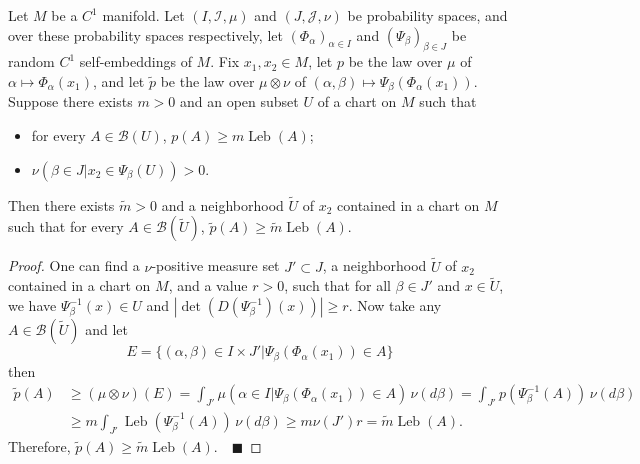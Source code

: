 \documentclass[tablecaption=bottom,wcp]{jmlr} %
\begin{document}
\begin{lemma} \label{Newman lemma}
    Let $M$ be a $C^1$ manifold. Let $(I, \mathcal{I}, \mu)$ and $(J, \mathcal{J}, \nu)$ be probability spaces, and over these probability spaces respectively, let $(\Phi_\alpha)_{\alpha\in I}$ and $(\Psi_\beta)_{\beta\in J}$ be random $C^1$ self-embeddings of $M$. Fix $x_1, x_2 \in M$, let $p$ be the law over $\mu$ of $\alpha \mapsto \Phi_\alpha(x_1)$, and let $\tilde{p}$ be the law over $\mu \otimes \nu$ of $(\alpha, \beta) \mapsto \Psi_\beta(\Phi_\alpha(x_1))$. Suppose there exists $m > 0$ and an open subset $U$ of a chart on $M$ such that
\begin{itemize}
    \item for every $A\in\mathcal{B}(U)$, $p(A) \geq m \operatorname{Leb}(A)$;
    \item $\nu(\beta\in J \vert x_2 \in \Psi_\beta(U)) > 0$.
\end{itemize}
Then there exists $\tilde{m} > 0$ and a neighborhood $\tilde{U}$ of $x_2$ contained in a chart on $M$ such that for every $A\in\mathcal{B}(\tilde{U})$, $\tilde{p}(A) \geq \tilde{m} \operatorname{Leb}(A)$.
\end{lemma}
\begin{proof}
One can find a $\nu$-positive measure set $J' \subset J$, a neighborhood $\tilde{U}$ of $x_2$ contained in a chart on $M$, and a value $r > 0$, such that for all $\beta\in J'$ and $x\in\tilde{U}$, we have $\Psi^{-1}_\beta(x)\in U$ and $|\operatorname{det}(D(\Psi^{-1}_\beta)(x))|\geq r$. Now take any $A\in\mathcal{B}(\tilde{U})$ and let
\begin{equation*}
    E=\{(\alpha, \beta)\in I\times J' \vert \Psi_\beta(\Phi_\alpha(x_1))\in A\}    
\end{equation*}
then
\begin{align*}
\tilde{p}(A) &\geq (\mu\otimes\nu)(E) = \int_{J'}\mu(\alpha\in I \vert \Psi_\beta(\Phi_\alpha(x_1))\in A)\,\nu(d\beta) 
= \int_{J'}p(\Psi^{-1}_\beta(A))\,\nu(d\beta)  \\
&\geq m\int_{J'}\operatorname{Leb}(\Psi^{-1}_\beta(A))\,\nu(d\beta) 
\geq m\nu(J')r = \tilde{m}\operatorname{Leb}(A).
\end{align*}
Therefore, $\tilde{p}(A) \geq \tilde{m} \operatorname{Leb}(A). \quad \blacksquare$
\end{proof}
\end{document}
